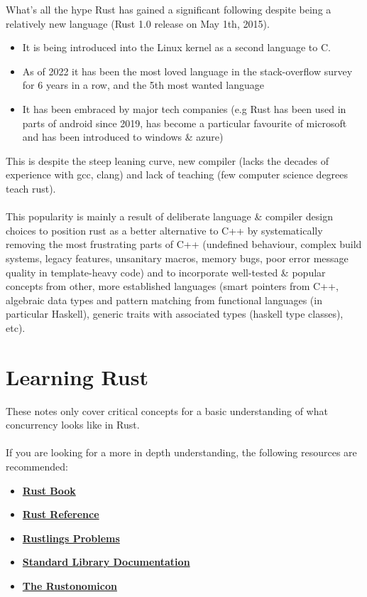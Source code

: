 \begin{sidenotebox}{What's all the hype}
	Rust has gained a significant following despite being a relatively new language (Rust 1.0 release on May 1th, 2015).
	\begin{itemize}
		\item It is being introduced into the Linux kernel as a second language to C.
		\item As of 2022 it has been the most loved language in the stack-overflow survey for 6 years in a row, and the 5th most wanted language
		\item It has been embraced by major tech companies (e.g Rust has been used in parts of android since 2019, has become a particular favourite of microsoft and has been introduced to windows \& azure)
	\end{itemize}
	This is despite the steep leaning curve, new compiler (lacks the decades of experience with gcc, clang) and lack of teaching (few computer science degrees teach rust).
	\\
	\\ This popularity is mainly a result of deliberate language \& compiler design choices to position rust as a better alternative to C++  by systematically removing the most frustrating parts of C++ (undefined behaviour, complex build systems, legacy features, unsanitary macros, memory bugs, poor error message quality in template-heavy code) and to incorporate well-tested \& popular concepts from other, more established languages (smart pointers from C++, algebraic data types and pattern matching from functional languages (in particular Haskell), generic traits with associated types (haskell type classes), etc).
\end{sidenotebox}

\section{Learning Rust}
These notes only cover critical concepts for a basic understanding of what concurrency looks like in Rust.
\\
\\ If you are looking for a more in depth understanding, the following resources are recommended:
\begin{itemize}
	\item \href{https://doc.rust-lang.org/book/}{\textbf{Rust Book}}
	\item \href{https://doc.rust-lang.org/reference/}{\textbf{Rust Reference}}
	\item \href{https://github.com/rust-lang/rustlings}{\textbf{Rustlings Problems}}
	\item \href{https://doc.rust-lang.org/std/}{\textbf{Standard Library Documentation}}
	\item \href{https://doc.rust-lang.org/nomicon/}{\textbf{The Rustonomicon}}
\end{itemize}

